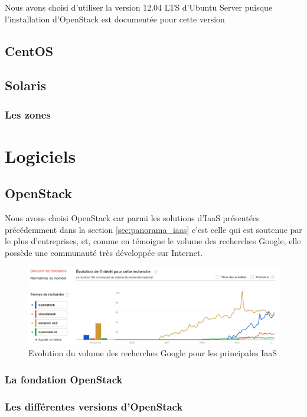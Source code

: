 \documentclass[a4paper,oneside]{report}
\begin{document}
Nous avons choisi d'utiliser la version 12.04 LTS d'Ubuntu Server puisque l'installation d'OpenStack est documentée pour cette version
\section{CentOS}

\section{Solaris}

\subsection{Les zones}


\chapter{Logiciels}
\section{OpenStack}
Nous avons choisi OpenStack car parmi les solutions d'IaaS présentées précédemment dans la section \ref{sec:panorama_iaas} c'est celle qui est soutenue par le plus d'entreprises, et, comme en témoigne le volume des recherches Google, elle possède une communauté très développée sur Internet.
\begin{figure}[h!]
\centering
\includegraphics[resolution=140]{images/recherches_iaas.png}
\caption{Evolution du volume des recherches Google pour les principales IaaS}
\end{figure}


\subsection{La fondation OpenStack}

\subsection{Les différentes versions d'OpenStack}
\end{document}
